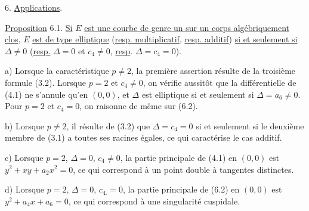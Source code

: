 
6. \quad \uline{Applications}.

\uline{Proposition} 6.1. \quad \uline{Si} $E$ \uline{est une courbe de genre un sur un corps algébriquement clos}, $E$ \uline{est de type elliptique} (\uline{resp. multiplicatif}, \uline{resp. additif}) \uline{si et seulement si} $\Delta\ne 0$ (\uline{resp.} $\Delta=0$ et $c_4\ne 0$, \uline{resp}. $\Delta=c_4=0$).

a) \quad Lorsque la caractéristique $p\ne 2$, la première assertion résulte de la troisième formule (3.2). Lorsque $p=2$ et $c_4\ne 0$, on vérifie aussitôt que la différentielle de (4.1) ne s'annule qu'en $(0,0)$, et $\Delta$ est elliptique si et seulement si $\Delta=a_6\ne 0$. Pour $p=2$ et $c_4=0$, on raisonne de même sur (6.2).

b) \quad Lorsque $p\ne 2$, il résulte de (3.2) que $\Delta=c_4=0$ si et seulement si le deuxième membre de (3.1) a toutes ses racines égales, ce qui caractérise le cas additif.

c) \quad Lorsque $p=2$, $\Delta=0$, $c_4\ne 0$, la partie principale de (4.1) en $(0,0)$ est $y^2+xy+a_2x^2=0$, ce qui correspond à un point double à tangentes distinctes.

d) \quad Lorsque $p=2$, $\Delta=0$, $c_{4.}=0$, la partie principale de (6.2) en $(0,0)$ est $y^2+a_4x+a_6=0$, ce qui correspond à une singularité cuspidale.

